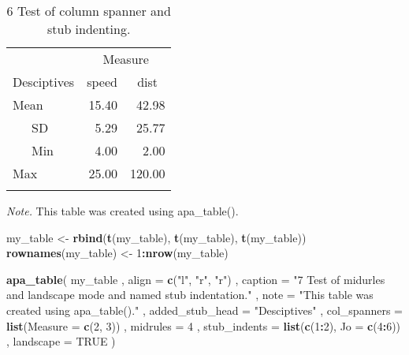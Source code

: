 \documentclass[english,man]{apa6}
\newenvironment{Shaded}{\begin{snugshade}}{\end{snugshade}}
\newcommand{\DataTypeTok}[1]{\textcolor[rgb]{0.13,0.29,0.53}{#1}}
\newcommand{\DecValTok}[1]{\textcolor[rgb]{0.00,0.00,0.81}{#1}}
\newcommand{\KeywordTok}[1]{\textcolor[rgb]{0.13,0.29,0.53}{\textbf{#1}}}
\newcommand{\NormalTok}[1]{#1}
\newcommand{\OperatorTok}[1]{\textcolor[rgb]{0.81,0.36,0.00}{\textbf{#1}}}
\newcommand{\OtherTok}[1]{\textcolor[rgb]{0.56,0.35,0.01}{#1}}
\newcommand{\StringTok}[1]{\textcolor[rgb]{0.31,0.60,0.02}{#1}}
\begin{document}
\begin{table}[tbp]

\begin{center}
\begin{threeparttable}

\caption{\label{tab:unnamed-chunk-13}6 Test of column spanner and stub indenting.}

\begin{tabular}{lrr}
\toprule
 & \multicolumn{2}{c}{Measure} \\
\cmidrule(r){2-3}
Desciptives & \multicolumn{1}{c}{speed} & \multicolumn{1}{c}{dist}\\
\midrule
Mean & 15.40 & 42.98\\
\ \ \ SD & 5.29 & 25.77\\
\ \ \ Min & 4.00 & 2.00\\
Max & 25.00 & 120.00\\
\bottomrule
\addlinespace
\end{tabular}

\begin{tablenotes}[para]
\normalsize{\textit{Note.} This table was created using apa\_table().}
\end{tablenotes}

\end{threeparttable}
\end{center}

\end{table}

\begin{Shaded}
\begin{Highlighting}[]
\NormalTok{my_table <-}\StringTok{ }\KeywordTok{rbind}\NormalTok{(}\KeywordTok{t}\NormalTok{(my_table), }\KeywordTok{t}\NormalTok{(my_table), }\KeywordTok{t}\NormalTok{(my_table))}
\KeywordTok{rownames}\NormalTok{(my_table) <-}\StringTok{ }\DecValTok{1}\OperatorTok{:}\KeywordTok{nrow}\NormalTok{(my_table)}

\KeywordTok{apa_table}\NormalTok{(}
\NormalTok{  my_table}
\NormalTok{  , }\DataTypeTok{align =} \KeywordTok{c}\NormalTok{(}\StringTok{"l"}\NormalTok{, }\StringTok{"r"}\NormalTok{, }\StringTok{"r"}\NormalTok{)}
\NormalTok{  , }\DataTypeTok{caption =} \StringTok{"7 Test of midurles and landscape mode and named stub indentation."}
\NormalTok{  , }\DataTypeTok{note =} \StringTok{"This table was created using apa_table()."}
\NormalTok{  , }\DataTypeTok{added_stub_head =} \StringTok{"Desciptives"}
\NormalTok{  , }\DataTypeTok{col_spanners =} \KeywordTok{list}\NormalTok{(}\DataTypeTok{Measure =} \KeywordTok{c}\NormalTok{(}\DecValTok{2}\NormalTok{, }\DecValTok{3}\NormalTok{))}
\NormalTok{  , }\DataTypeTok{midrules =} \DecValTok{4}
\NormalTok{  , }\DataTypeTok{stub_indents =} \KeywordTok{list}\NormalTok{(}\KeywordTok{c}\NormalTok{(}\DecValTok{1}\OperatorTok{:}\DecValTok{2}\NormalTok{), }\DataTypeTok{Jo =} \KeywordTok{c}\NormalTok{(}\DecValTok{4}\OperatorTok{:}\DecValTok{6}\NormalTok{))}
\NormalTok{  , }\DataTypeTok{landscape =} \OtherTok{TRUE}
\NormalTok{)}
\end{Highlighting}
\end{Shaded}
\end{document}
